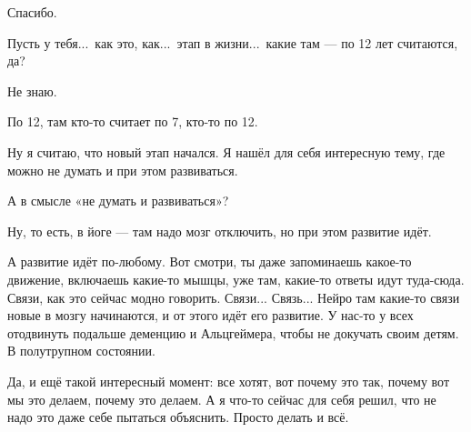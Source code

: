 \I
Спасибо.

\M
Пусть у тебя...\ как это, как...\ этап в жизни...\ какие там --- по 12 лет считаются, да?

\I
Не знаю.

\M
По 12, там кто-то считает по 7, кто-то по 12.

\I
Ну я считаю, что новый этап начался. Я нашёл для себя интересную тему,
где можно не думать и при этом развиваться.

\M
А в смысле «не думать и развиваться»?

\I
Ну, то есть, в йоге --- там надо мозг отключить, но при этом развитие идёт.

\M
А развитие идёт по-любому.
Вот смотри, ты даже запоминаешь какое-то движение, включаешь какие-то мышцы,
уже там, какие-то ответы идут туда-сюда.
Связи, как это сейчас модно говорить.
Связи...
Связь... Нейро там какие-то связи новые в мозгу начинаются, и от этого идёт его развитие.
У нас-то у всех отодвинуть подальше деменцию и Альцгеймера, чтобы не докучать своим детям.
В полутрупном состоянии.

\I
Да, и ещё такой интересный момент: все хотят, вот почему это так, почему вот мы это делаем,
почему это делаем. А я что-то сейчас для себя решил, что не надо это даже себе пытаться объяснить.
Просто делать и всё.

